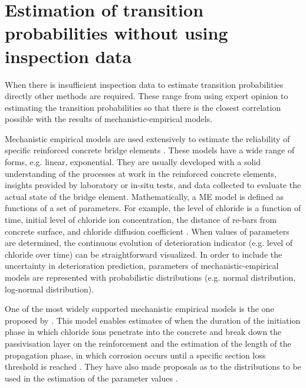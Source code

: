 \documentclass[Journal]{ascelike}
\begin{document}
\section{Estimation of transition probabilities without using inspection data }

When there is insufficient inspection data to estimate transition
probabilities directly other methods are required. These range from
using expert opinion to estimating the transition probabilities so
that there is the closest correlation possible with the results of
mechanistic-empirical models.

Mechanistic empirical models are used extensively to estimate the reliability
of specific reinforced concrete bridge elements \cite{DuraCrete1998,Kirkpatrick2002}.
These models have a wide range of forms, e.g. linear, exponential.
They are usually developed with a solid understanding of the processes
at work in the reinforced concrete elements, insights provided by
laboratory or in-situ tests, and data collected to evaluate the actual
state of the bridge element. Mathematically, a ME model is defined
as functions of a set of parameters. For example, the level of chloride
is a function of time, initial level of chloride ion concentration,
the distance of re-bars from concrete surface, and chloride diffusion
coefficient \cite{Kirkpatrick2002}. When values of parameters are
determined, the continuous evolution of deterioration indicator (e.g.
level of chloride over time) can be straightforward visualized. In
order to include the uncertainty in deterioration prediction, parameters
of mechanistic-empirical models are represented with probabilistic
distributions (e.g. normal distribution, log-normal distribution). 

One of the most widely supported mechanistic empirical models is the
one proposed by \cite{DuraCrete1998,Kirkpatrick2002}. This model
enables estimates of when the duration of the initiation phase in
which chloride ions penetrate into the concrete and break down the
passivisation layer on the reinforcement and the estimation of the
length of the propagation phase, in which corrosion occurs until a
specific section loss threshold is reached . They have also made proposals
as to the distributions to be used in the estimation of the parameter
values \cite{DuraCrete2000}.
\end{document}
